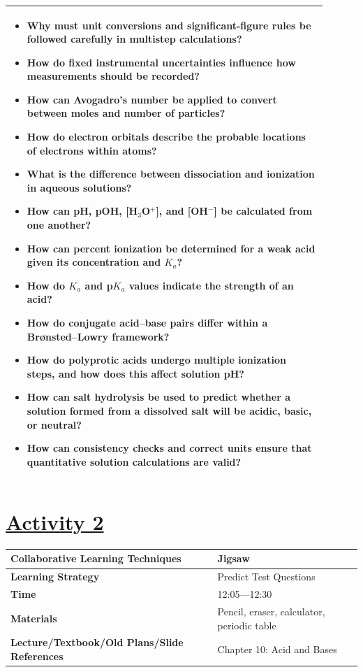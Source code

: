 \documentclass{article}
\begin{document}
\begin{tabular}{|p{0.9\linewidth}|}
\hline
\begin{itemize}
    \item Why must unit conversions and significant-figure rules be followed carefully in multistep calculations?
    \item How do fixed instrumental uncertainties influence how measurements should be recorded?
    \item How can Avogadro’s number be applied to convert between moles and number of particles?
    \item How do electron orbitals describe the probable locations of electrons within atoms?
    \item What is the difference between dissociation and ionization in aqueous solutions?
    \item How can pH, pOH, [H$_3$O$^+$], and [OH$^-$] be calculated from one another?
    \item How can percent ionization be determined for a weak acid given its concentration and $K_a$?
    \item How do $K_a$ and p$K_a$ values indicate the strength of an acid?
    \item How do conjugate acid–base pairs differ within a Brønsted–Lowry framework?
    \item How do polyprotic acids undergo multiple ionization steps, and how does this affect solution pH?
    \item How can salt hydrolysis be used to predict whether a solution formed from a dissolved salt will be acidic, basic, or neutral?
    \item How can consistency checks and correct units ensure that quantitative solution calculations are valid?
\end{itemize} \\[0.2cm]
\hline
\end{tabular}



\newpage

\section*{\underline{Activity 2}}
\vspace{0.2cm}
\begin{tabular}{|p{4.2cm}|p{9.8cm}|}
\hline
\textbf{Collaborative Learning Techniques} & Jigsaw\\
\hline
\textbf{Learning Strategy} & Predict Test Questions \\
\hline
\textbf{Time} & 12:05---12:30\\
\hline
\textbf{Materials} & Pencil, eraser, calculator, periodic table \\
\hline
\textbf{Lecture/Textbook/Old Plans/Slide References} & Chapter 10: Acid and Bases \\
\hline
\end{tabular}
\vspace{0.5cm}
\end{document}
